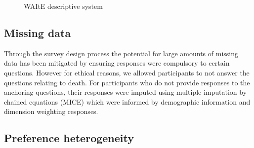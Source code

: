 \documentclass[
  number,
  preprint]{elsarticle}
\begin{document}
\begin{figure}


\caption{\label{fig-waite-descriptive}WAItE descriptive system}

\end{figure}%

\subsection{Missing data}\label{missing-data}

Through the survey design process the potential for large amounts of
missing data has been mitigated by ensuring responses were compulsory to
certain questions. However for ethical reasons, we allowed participants
to not answer the questions relating to death. For participants who do
not provide responses to the anchoring questions, their responses were
imputed using multiple imputation by chained equations (MICE)
\citep{White2011MultiplePractice} which were informed by demographic
information and dimension weighting responses.

\subsection{Preference heterogeneity}\label{preference-heterogeneity}
\end{document}
